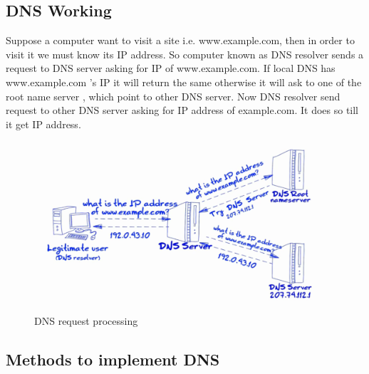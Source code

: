 \documentclass[11pt]{article}
\begin{document}
\subsection{DNS Working}
Suppose a computer want to visit a site i.e. www.example.com, then in order to visit it we must know its IP address. So computer known as DNS resolver sends a request to DNS server asking for IP of www.example.com. If local DNS has www.example.com 's IP it will return the same otherwise it will ask to one of the root name server , which point to other DNS server. Now DNS resolver send request to other DNS server asking for IP address of example.com. It does so till it get IP address. 
\begin{figure}[h]
\includegraphics[scale=0.4]{dns.png}
\caption{DNS request processing}
\end{figure}

\subsection{Methods to implement DNS}
\end{document}
